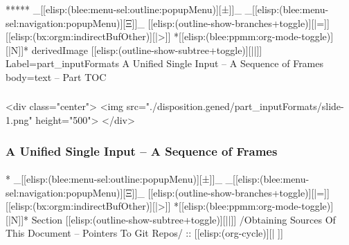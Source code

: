 \begin{whenOrg}
\begin{whenOrg}
*****  _[[elisp:(blee:menu-sel:outline:popupMenu)][±]]_ _[[elisp:(blee:menu-sel:navigation:popupMenu)][Ξ]]_ [[elisp:(outline-show-branches+toggle)][|=]] [[elisp:(bx:orgm:indirectBufOther)][|>]] *[[elisp:(blee:ppmm:org-mode-toggle)][|N]]*  derivedImage [[elisp:(outline-show-subtree+toggle)][||]] Label=part_inputFormats A Unified Single Input -- A Sequence of Frames body=text -- Part TOC
\end{whenOrg}

\begin{htmlonly}

\begin{frame}[fragile,plain,label=part_inputFormats]
    \frametitle{}
    \framesubtitle{}
    \begin{rawhtml}
<div class="center">
<img src="./disposition.gened/part_inputFormats/slide-1.png" height="500">
</div>
    \end{rawhtml}
\end{frame}
\end{htmlonly}

\begin{verblatex}

\begin{frame}[fragile,label=part_inputFormats]
    \frametitle{A Unified Single Input -- A Sequence of Frames}
    \framesubtitle{}

    \tableofcontents


\end{frame}
\end{verblatex}



\begin{whenOrg}
*  _[[elisp:(blee:menu-sel:outline:popupMenu)][±]]_ _[[elisp:(blee:menu-sel:navigation:popupMenu)][Ξ]]_ [[elisp:(outline-show-branches+toggle)][|=]] [[elisp:(bx:orgm:indirectBufOther)][|>]] *[[elisp:(blee:ppmm:org-mode-toggle)][|N]]*  Section    [[elisp:(outline-show-subtree+toggle)][||]]   /Obtaining Sources Of This Document -- Pointers To Git Repos/ ::  [[elisp:(org-cycle)][| ]]
\end{whenOrg}


\end{whenOrg}
